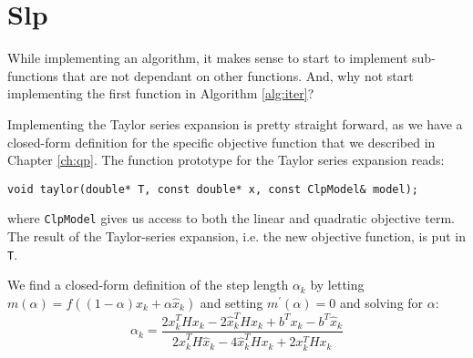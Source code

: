 \section{Slp}
While implementing an algorithm, it makes sense to start to implement
sub-functions that are not dependant on other functions. And, why not
start implementing the first function in Algorithm \ref{alg:iter}?

Implementing the Taylor series expansion is pretty straight forward, as
we have a closed-form definition for the specific objective function that
we described in Chapter \ref{ch:qp}. The function prototype for the
Taylor series expansion reads:
\begin{verbatim}
void taylor(double* T, const double* x, const ClpModel& model);
\end{verbatim}
where \texttt{ClpModel} gives us access to both the linear and quadratic
objective term. The result of the Taylor-series expansion, i.e. the new
objective function, is put in \texttt{T}.

We find a closed-form definition of the step length $\alpha_k$ by letting
$m(\alpha) = f((1-\alpha) x_k + \alpha \hat{x}_k)$ and setting
$m^\prime(\alpha) = 0$ and solving for $\alpha$:
\[
\alpha_k = \frac{
                2x_k^T H x_k
                - 2\hat{x}_k^T H x_k
                + b^T x_k - b^T \hat{x}_k
                }{
                  2\hat{x}_k^T H \hat{x}_k
                - 4\hat{x}_k^T H x_k
                + 2x_k^T H x_k
                }
\]


